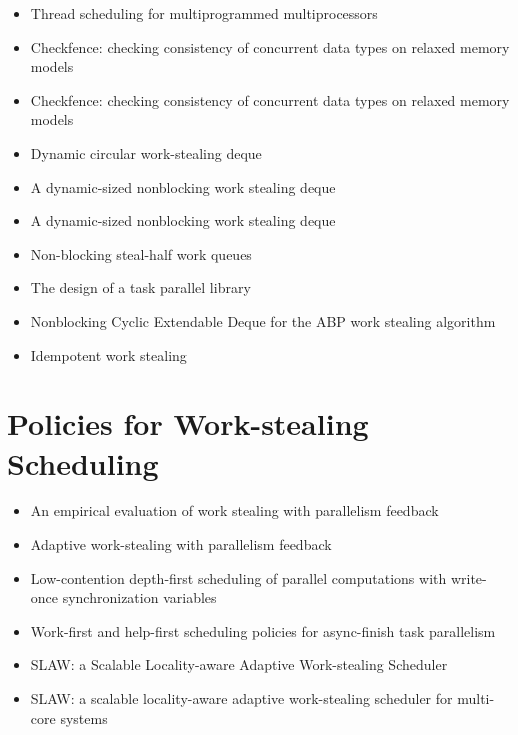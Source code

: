 \begin{itemize}
\item Thread scheduling for multiprogrammed multiprocessors
  \cite{Arora2001}
\item Checkfence: checking consistency of concurrent data types on
  relaxed memory models \cite{Burckhardt2007}
\item Checkfence: checking consistency of concurrent data types on
  relaxed memory models \cite{Burckhardt2007a}
\item Dynamic circular work-stealing deque \cite{Chase2008}
\item A dynamic-sized nonblocking work stealing deque
  \cite{Hendler2005}
\item A dynamic-sized nonblocking work stealing deque
  \cite{Hendler2006}
\item Non-blocking steal-half work queues \cite{Hendler2002}
\item The design of a task parallel library \cite{Leijen2009}
\item Nonblocking Cyclic Extendable Deque for the ABP work stealing
  algorithm \cite{Lev2005}
\item Idempotent work stealing \cite{Michael2009}
\end{itemize}


\section{Policies for Work-stealing Scheduling}
\label{sec:lr-policies-for-work-stealing-scheduling}

\begin{itemize}
\item An empirical evaluation of work stealing with parallelism
  feedback \cite{Agrawal2006}
\item Adaptive work-stealing with parallelism feedback
  \cite{Agrawal2008}
\item Low-contention depth-first scheduling of parallel computations
  with write-once synchronization variables \cite{Fatourou2001}
\item Work-first and help-first scheduling policies for async-finish
  task parallelism \cite{Guo2009}
\item SLAW: a Scalable Locality-aware Adaptive Work-stealing Scheduler
  \cite{Guo}
\item SLAW: a scalable locality-aware adaptive work-stealing scheduler
  for multi-core systems \cite{Guo2010}
\end{itemize}


